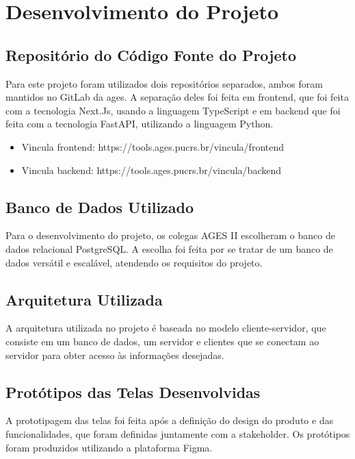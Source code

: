 \section[Desenvolvimento do Projeto]{Desenvolvimento do Projeto}

\subsection{Repositório do Código Fonte do Projeto} %
  Para este projeto foram utilizados dois repositórios separados, ambos foram mantidos no GitLab da \ac{ages}. A separação deles foi feita em frontend, que foi feita com a tecnologia Next.Js\cite{nextjs}, usando a linguagem TypeScript\cite{typescript} e em backend que foi feita com a tecnologia FastAPI\cite{fastapi}, utilizando a linguagem Python\cite{python}.
  
    \begin{itemize}
      \item Vincula frontend: https://tools.ages.pucrs.br/vincula/frontend
      \item Vincula backend: https://tools.ages.pucrs.br/vincula/backend
    \end{itemize}

\subsection{Banco de Dados Utilizado}
  Para o desenvolvimento do projeto, os colegas AGES II escolheram o banco de dados relacional PostgreSQL\cite{postgresql}. A escolha foi feita por se tratar de um banco de dados versátil e escalável, atendendo os requisitos do projeto.


    
\subsection{Arquitetura Utilizada} %
  A arquitetura utilizada no projeto é baseada no modelo cliente-servidor, que consiste em um banco de dados, um servidor e clientes que se conectam ao servidor para obter acesso às informações desejadas.

\subsection{Protótipos das Telas Desenvolvidas} %
  A prototipagem das telas foi feita após a definição do design do produto e das funcionalidades, que foram definidas juntamente com a stakeholder. Os protótipos foram produzidos utilizando a plataforma Figma\cite{figma}.

